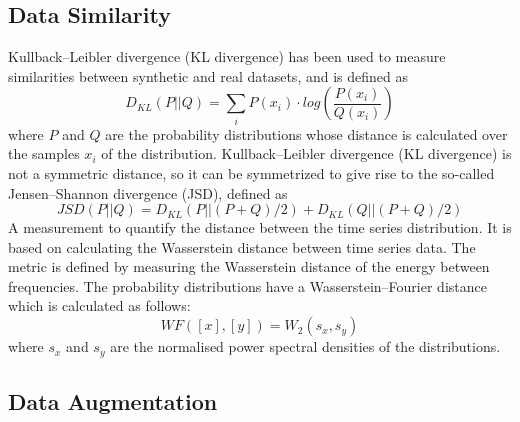 \documentclass[journal]{IEEEtran}
\begin{document}
\subsection{Data Similarity}
Kullback–Leibler divergence (KL divergence) has been used to measure similarities between synthetic and real datasets, and is defined as
$$D_{KL}(P||Q)=\sum_{i}P(x_i )\cdot log\left(\frac{P(x_i)}{Q(x_i)}\right)$$
where $P$ and $Q$ are the probability distributions whose distance is calculated over the samples $x_i$  of the distribution\cite{iglesias2023data}. Kullback–Leibler divergence (KL divergence) is not a symmetric distance, so it can be symmetrized to give rise to the so-called Jensen–Shannon divergence (JSD), defined as
$$JSD(P||Q)=D_{KL} (P||(P+Q)/2) +D_{KL}(Q||(P+Q)/2)$$
A measurement to quantify the distance between the time series distribution. It is based on calculating the Wasserstein distance between time series data. The metric is defined by measuring the Wasserstein distance of the energy between frequencies. The probability distributions have a Wasserstein–Fourier distance which is calculated as follows\cite{iglesias2023data}:
$$WF([x],[y])=W_2 (s_x,s_y)$$
where $s_x$ and $s_y$ are the normalised power spectral densities of the distributions.



\subsection{Data Augmentation}
\end{document}
